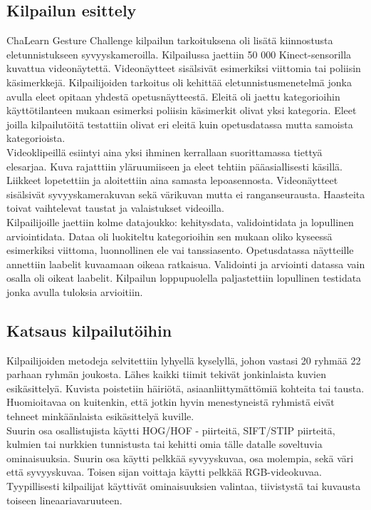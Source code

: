 \subsection{Kilpailun esittely}
ChaLearn Gesture Challenge kilpailun tarkoituksena oli lisätä kiinnostusta eletunnistukseen syvyyskameroilla.
Kilpailussa jaettiin 50 000 Kinect-sensorilla kuvattua videonäytettä. Videonäytteet sisälsivät esimerkiksi viittomia
tai poliisin käsimerkkejä. Kilpailijoiden tarkoitus oli kehittää eletunnistusmenetelmä jonka avulla eleet opitaan yhdestä opetusnäytteestä.
Eleitä oli jaettu kategorioihin käyttötilanteen mukaan esimerksi poliisin käsimerkit olivat yksi kategoria. Eleet joilla kilpailutöitä
testattiin olivat eri eleitä kuin opetusdatassa mutta samoista kategorioista.  \\

Videoklipeillä esiintyi aina yksi ihminen kerrallaan suorittamassa tiettyä elesarjaa. Kuva rajatttiin yläruumiiseen ja eleet tehtiin
pääasiallisesti käsillä. Liikkeet lopetettiin ja aloitettiin aina samasta lepoasennosta. Videonäytteet sisälsivät syvyyskamerakuvan sekä värikuvan 
mutta ei ranganseurausta. Haasteita toivat vaihtelevat taustat ja valaistukset videoilla. \\

Kilpailijoille jaettiin kolme datajoukko: kehitysdata, validointidata ja lopullinen arviointidata. Dataa oli luokiteltu kategorioihin sen mukaan
oliko kyseessä esimerkiksi viittoma, luonnollinen ele vai tanssiasento. Opetusdatassa näytteille annettiin laabelit kuvaamaan oikeaa ratkaisua.
Validointi ja arviointi datassa vain osalla oli oikeat laabelit. Kilpailun loppupuolella paljastettiin lopullinen testidata jonka avulla tuloksia arvioitiin.
\citep {6239178} \\


\subsection{Katsaus kilpailutöihin}
Kilpailijoiden metodeja selvitettiin lyhyellä kyselyllä, johon vastasi 20 ryhmää 22 parhaan ryhmän joukosta.
Lähes kaikki tiimit tekivät jonkinlaista kuvien esikäsittelyä. Kuvista poistetiin häiriötä, asiaanliittymättömiä kohteita tai tausta.
Huomioitavaa on kuitenkin, että jotkin hyvin menestyneistä ryhmistä eivät tehneet minkäänlaista esikäsittelyä kuville.\\

Suurin osa osallistujista käytti HOG/HOF - piirteitä, SIFT/STIP piirteitä, kulmien tai nurkkien tunnistusta tai kehitti omia tälle datalle soveltuvia ominaisuuksia.
Suurin osa käytti pelkkää syvyyskuvaa, osa molempia, sekä väri että syvyyskuvaa. Toisen sijan voittaja käytti pelkkää RGB-videokuvaa. 
Tyypillisesti kilpailijat käyttivät ominaisuuksien valintaa, tiivistystä tai kuvausta toiseen lineaariavaruuteen.\\

